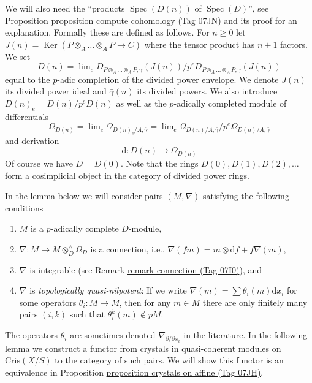 \documentclass{amsart}
\theoremstyle{plain}
\theoremstyle{definition}
\theoremstyle{remark}
\numberwithin{equation}{subsection}
\def\lim{\mathop{\mathrm{lim}}\nolimits}
\def\Spec{\mathop{\mathrm{Spec}}}
\def\Ker{\mathop{\mathrm{Ker}}}
\begin{document}
\medskip\noindent
We will also need the ``products $\Spec(D(n))$ of $\Spec(D)$'', see
Proposition \href{https://stacks.math.columbia.edu/tag/07JN}{proposition compute cohomology (Tag 07JN)} and its proof for an
explanation. Formally these are defined as follows. For $n \geq 0$ let
$J(n) = \Ker(P \otimes_A \ldots \otimes_A P \to C)$ where
the tensor product has $n + 1$ factors. We set
\begin{equation}
\label{equation-Dn}
D(n) = \lim_e
D_{P \otimes_A \ldots \otimes_A P, \gamma}(J(n))/
p^eD_{P \otimes_A \ldots \otimes_A P, \gamma}(J(n))
\end{equation}
equal to the $p$-adic completion of the divided power envelope.
We denote $\bar J(n)$ its divided power ideal and $\bar \gamma(n)$
its divided powers. We also introduce $D(n)_e = D(n)/p^eD(n)$ as well
as the $p$-adically completed module of differentials
\begin{equation}
\label{equation-omega-Dn}
\Omega_{D(n)} = \lim_e \Omega_{D(n)_e/A, \bar\gamma} =
\lim_e \Omega_{D(n)/A, \bar\gamma}/p^e\Omega_{D(n)/A, \bar\gamma}
\end{equation}
and derivation
\begin{equation}
\label{equation-derivation-Dn}
\text{d} : D(n) \longrightarrow \Omega_{D(n)}
\end{equation}
Of course we have $D = D(0)$. Note that the rings $D(0), D(1), D(2), \ldots$
form a cosimplicial object in the category of divided power rings.



\noindent
In the lemma below we will consider pairs $(M, \nabla)$ satisfying the
following conditions
\begin{enumerate}
\item
\label{item-complete}
$M$ is a $p$-adically complete $D$-module,
\item
\label{item-connection}
$\nabla : M \to M \otimes^\wedge_D \Omega_D$ is a connection, i.e.,
$\nabla(fm) = m \otimes \text{d}f + f\nabla(m)$,
\item
\label{item-integrable}
$\nabla$ is integrable
(see Remark \href{https://stacks.math.columbia.edu/tag/07I0}{remark connection (Tag 07I0)}), and
\item
\label{item-topologically-quasi-nilpotent}
$\nabla$ is {\it topologically quasi-nilpotent}: If we write
$\nabla(m) = \sum \theta_i(m)\text{d}x_i$ for some operators
$\theta_i : M \to M$, then for any $m \in M$ there are only finitely
many pairs $(i, k)$ such that $\theta_i^k(m) \not \in pM$.
\end{enumerate}
The operators $\theta_i$ are sometimes denoted
$\nabla_{\partial/\partial x_i}$ in the literature.
In the following lemma we construct a functor from crystals in quasi-coherent
modules on $\text{Cris}(X/S)$ to the category of such pairs. We will show
this functor is an equivalence in
Proposition \href{https://stacks.math.columbia.edu/tag/07JH}{proposition crystals on affine (Tag 07JH)}.
\end{document}
